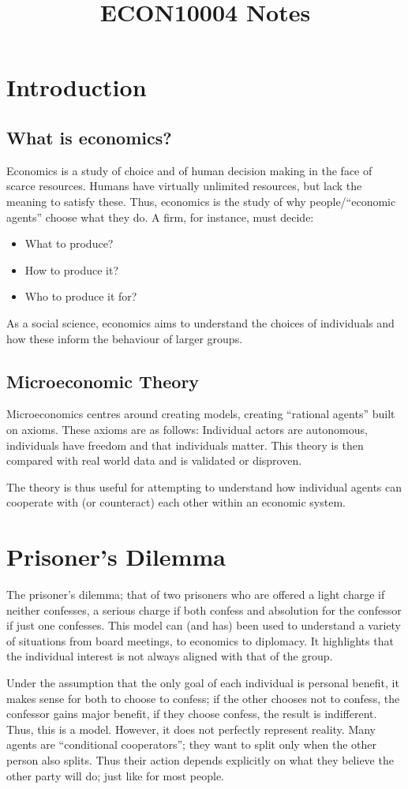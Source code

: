 \documentclass[12pt]{report}
\begin{document}
\title{ECON10004 Notes}
\chapter*{Introduction}

\section*{What is economics?}
Economics is a study of choice and of human decision making in the face of scarce resources.
Humans have virtually unlimited resources, but lack the meaning to satisfy these.
Thus, economics is the study of why people/``economic agents'' choose what they do.
A firm, for instance, must decide:
\begin{itemize}
\item What to produce?
\item How to produce it?
\item Who to produce it for?
\end{itemize}
As a social science, economics aims to understand the choices of individuals and how these inform the behaviour of larger groups.

\section*{Microeconomic Theory}
Microeconomics centres around creating models, creating ``rational agents'' built on axioms.
These axioms are as follows: Individual actors are autonomous, individuals have freedom and that individuals matter.
This theory is then compared with real world data and is validated or disproven.
\par
The theory is thus useful for attempting to understand how individual agents can cooperate
with (or counteract) each other within an economic system. 

\chapter*{Prisoner's Dilemma}
The prisoner's dilemma; that of two prisoners who are offered a light charge if neither confesses,
a serious charge if both confess and absolution for the confessor if just one confesses.
This model can (and has) been used to understand a variety of situations from board meetings, 
to economics to diplomacy. It highlights that the individual interest is not always aligned with that of the group.
\par
Under the assumption that the only goal of each individual is personal benefit, it makes sense for both to
choose to confess; if the other chooses not to confess, the confessor gains major benefit, if they choose confess,
 the result is indifferent. Thus, this is a model. However, it does not perfectly represent reality. Many agents are
 ``conditional cooperators''; they want to split only when the other person also splits. Thus their action depends
 explicitly on what they believe the other party will do; just like for most people.
\par
\end{document}

